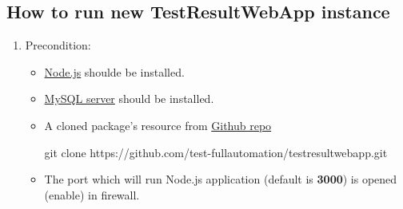 \subsection{How to run new TestResultWebApp instance}
\begin{enumerate}

\item Precondition:
\begin{itemize}
\item \href{https://nodejs.org/en/}{Node.js} shoulde be installed.
\item \href{https://dev.mysql.com/downloads/mysql/}{MySQL server} should be 
      installed.
\item A cloned package's resource from 
      \href{https://github.com/test-fullautomation/testresultwebapp}
      {Github repo}
\begin{robotlog}
git clone https://github.com/test-fullautomation/testresultwebapp.git
\end{robotlog}
\item The port which will run Node.js application (default is \textbf{3000}) is
      opened (enable) in firewall.

\end{itemize}


\end{enumerate}
